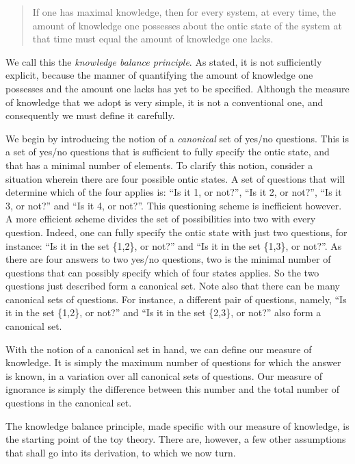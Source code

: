 \documentclass[pra,nofootinbib,showpacs,12pt]{revtex4}
\begin{document}
\begin{quotation}
If one has maximal knowledge, then for every system, at every time, the
amount of knowledge one possesses about the ontic state of the system at
that time must equal the amount of knowledge one lacks.
\end{quotation}

We call this the \emph{knowledge balance principle}. As stated, it is not
sufficiently explicit, because the manner of quantifying the amount of
knowledge one possesses and the amount one lacks has yet to be specified.
Although the measure of knowledge that we adopt is very simple, it is not a
conventional one, and consequently we must define it carefully.

We begin by introducing the notion of a \emph{canonical} set of yes/no
questions. This is a set of yes/no questions that is sufficient to fully
specify the ontic state, and that has a minimal number of elements. To
clarify this notion, consider a situation wherein there are four possible
ontic states. A set of questions that will determine which of the four
applies is: ``Is it 1, or not?'', ``Is it 2, or not?'', ``Is it 3, or not?''
and ``Is it 4, or not?''. This questioning scheme is inefficient however. A
more efficient scheme divides the set of possibilities into two with every
question. Indeed, one can fully specify the ontic state with just two
questions, for instance: ``Is it in the set \{1,2\}, or not?'' and ``Is it
in the set \{1,3\}, or not?''. As there are four answers to two yes/no
questions, two is the minimal number of questions that can possibly specify
which of four states applies. So the two questions just described form a
canonical set. Note also that there can be many canonical sets of questions.
For instance, a different pair of questions, namely, ``Is it in the set
\{1,2\}, or not?'' and ``Is it in the set \{2,3\}, or not?'' also form a
canonical set.

With the notion of a canonical set in hand, we can define our measure of
knowledge. It is simply the maximum number of questions for which the answer
is known, in a variation over all canonical sets of questions. Our measure
of ignorance is simply the difference between this number and the total
number of questions in the canonical set.

The knowledge balance principle, made specific with our measure of
knowledge, is the starting point of the toy theory. There are, however, a
few other assumptions that shall go into its derivation, to which we now
turn.
\end{document}
